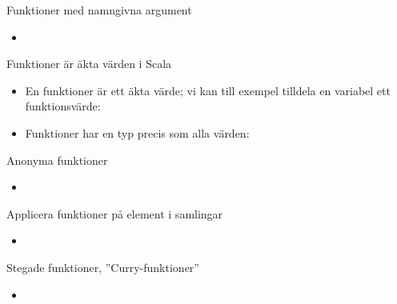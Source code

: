 \begin{Slide}{Funktioner med namngivna argument}
\begin{itemize}
\item 
\end{itemize}
\end{Slide} 



\begin{Slide}{Funktioner är äkta värden i Scala}
\begin{itemize}
\item En funktioner är ett äkta värde; vi kan till exempel tilldela en variabel ett funktionsvärde:
\item Funktioner har en typ precis som alla värden:
\end{itemize}
\end{Slide} 



\begin{Slide}{Anonyma funktioner}
\begin{itemize}
\item 
\end{itemize}
\end{Slide}




\begin{Slide}{Applicera funktioner på element i samlingar}
\begin{itemize}
\item 
\end{itemize}
\end{Slide} 




\begin{Slide}{Stegade funktioner, ''Curry-funktioner''}
\begin{itemize}
\item 
\end{itemize}
\end{Slide} 






